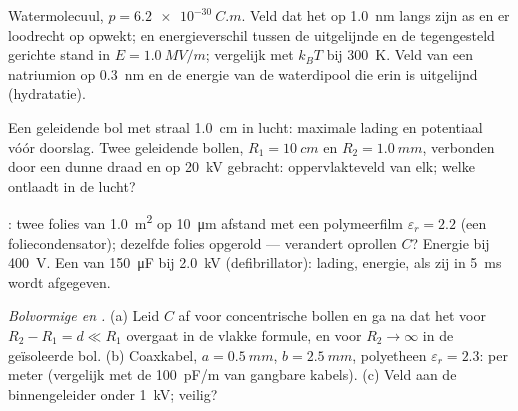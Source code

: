 \begin{exercise}[$\star\star$]\label{exo:b1:potential-capacitors:7}
Watermolecuul, $p = \qty{6.2e-30}{C.m}$. Veld dat het op \qty{1.0}{nm}
langs zijn as en er loodrecht op opwekt;  en energieverschil
tussen de uitgelijnde en de tegengesteld gerichte stand in $E = \qty{1.0}{MV/m}$;
vergelijk met $k_BT$ bij \qty{300}{K}. Veld van een natriumion op
\qty{0.3}{nm} en de energie van de waterdipool die erin is uitgelijnd (hydratatie).
\end{exercise}

\begin{exercise}[$\star\star$]\label{exo:b1:potential-capacitors:8}
Een geleidende bol met straal \qty{1.0}{cm} in lucht: maximale lading en
potentiaal vóór doorslag. Twee geleidende bollen, $R_1 = \qty{10}{cm}$
en $R_2 = \qty{1.0}{mm}$, verbonden door een dunne draad en op
\qty{20}{kV} gebracht: oppervlakteveld van elk; welke ontlaadt in de lucht?
\end{exercise}

\begin{exercise}[$\star\star$]\label{exo:b1:potential-capacitors:9}
: twee folies van \qty{1.0}{m^2} op \qty{10}{\micro m} afstand met een
polymeerfilm $\varepsilon_r = 2.2$ (een foliecondensator); dezelfde folies opgerold
--- verandert oprollen $C$? Energie bij \qty{400}{V}. Een  van \qty{150}{\micro F}
bij \qty{2.0}{kV} (defibrillator): lading, energie,  als zij
in \qty{5}{ms} wordt afgegeven.
\end{exercise}

\begin{exercise}[$\star\star\star$]\label{exo:b1:potential-capacitors:10}
\emph{Bolvormige en .} (a) Leid $C$ af voor
concentrische bollen en ga na dat het voor $R_2 - R_1 = d \ll R_1$ overgaat
in de vlakke formule, en voor $R_2 \to \infty$ in de geïsoleerde bol.
(b) Coaxkabel, $a = \qty{0.5}{mm}$, $b = \qty{2.5}{mm}$, polyetheen
$\varepsilon_r = 2.3$:  per meter (vergelijk met de \qty{100}{pF/m}
van gangbare kabels). (c) Veld aan de binnengeleider onder
\qty{1}{kV}; veilig?
\end{exercise}

